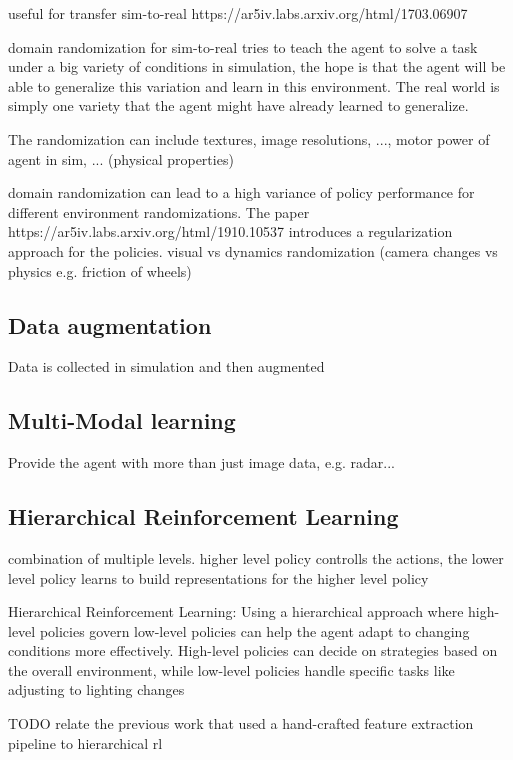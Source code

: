 useful for transfer sim-to-real
https://ar5iv.labs.arxiv.org/html/1703.06907

domain randomization for sim-to-real tries to teach the agent to solve a task under a big variety of conditions in simulation, the hope is that the agent will be able to generalize this variation and learn in this environment.
The real world is simply one variety that the agent might have already learned to generalize.

The randomization can include textures, image resolutions, ..., motor power of agent in sim, ... (physical properties)


domain randomization can lead to a high variance of policy performance for different environment randomizations. The paper https://ar5iv.labs.arxiv.org/html/1910.10537 introduces a regularization approach for the policies.
visual vs dynamics randomization (camera changes vs physics e.g. friction of wheels)

\subsection{Data augmentation}

Data is collected in simulation and then augmented



\subsection{Multi-Modal learning}

Provide the agent with more than just image data,  e.g. radar...


\subsection{Hierarchical Reinforcement Learning}

combination of multiple levels. higher level policy controlls the actions, the lower level policy learns to build representations for the higher level policy

Hierarchical Reinforcement Learning: Using a hierarchical approach where high-level policies govern low-level policies can help the agent adapt to changing conditions more effectively. High-level policies can decide on strategies based on the overall environment, while low-level policies handle specific tasks like adjusting to lighting changes


TODO relate the previous work that used a hand-crafted feature extraction pipeline to hierarchical rl

